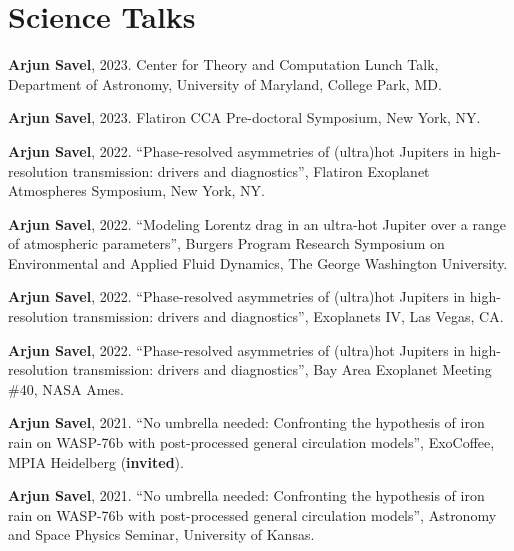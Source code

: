 \documentclass[letterpaper,10.5pt]{article}
\newcommand{\resumeSubHeadingListStart}{\begin{itemize}[leftmargin=*]}
\newcommand{\shorterSection}[1]{\vspace{-10pt}\section{#1}}
\begin{document}
\shorterSection{Science Talks}
\small
  \begin{list}{}{\cvlist}

  \item[{\color{numcolor}\scriptsize12}] \textbf{Arjun Savel}, 2023. Center for Theory and Computation Lunch Talk, Department of Astronomy, University of Maryland, College Park, MD.

  \item[{\color{numcolor}\scriptsize11}] \textbf{Arjun Savel}, 2023. Flatiron CCA Pre-doctoral Symposium, New York, NY.

\item[{\color{numcolor}\scriptsize10}] \textbf{Arjun Savel}, 2022. ``Phase-resolved asymmetries of (ultra)hot Jupiters in high-resolution transmission: drivers and diagnostics'', Flatiron Exoplanet Atmospheres Symposium, New York, NY.

  \item[{\color{numcolor}\scriptsize9}] \textbf{Arjun Savel}, 2022. ``Modeling Lorentz drag in an ultra-hot Jupiter over a range of atmospheric parameters'', Burgers Program Research Symposium on Environmental and Applied Fluid Dynamics, The George Washington University.

     \item[{\color{numcolor}\scriptsize8}] \textbf{Arjun Savel}, 2022. ``Phase-resolved asymmetries of (ultra)hot Jupiters in high-resolution transmission: drivers and diagnostics'', Exoplanets IV, Las Vegas, CA.


   \item[{\color{numcolor}\scriptsize7}] \textbf{Arjun Savel}, 2022. ``Phase-resolved asymmetries of (ultra)hot Jupiters in high-resolution transmission: drivers and diagnostics'', Bay Area Exoplanet Meeting \#40, NASA Ames.

 \item[{\color{numcolor}\scriptsize6}] \textbf{Arjun Savel}, 2021. ``No umbrella needed: Confronting the hypothesis of iron rain on WASP-76b with post-processed general circulation models'', ExoCoffee, MPIA Heidelberg (\textbf{invited}).

\item[{\color{numcolor}\scriptsize5}] \textbf{Arjun Savel}, 2021. ``No umbrella needed: Confronting the hypothesis of iron rain on WASP-76b with post-processed general circulation models'', Astronomy and Space Physics Seminar, University of Kansas.



\end{list}
\end{document}
